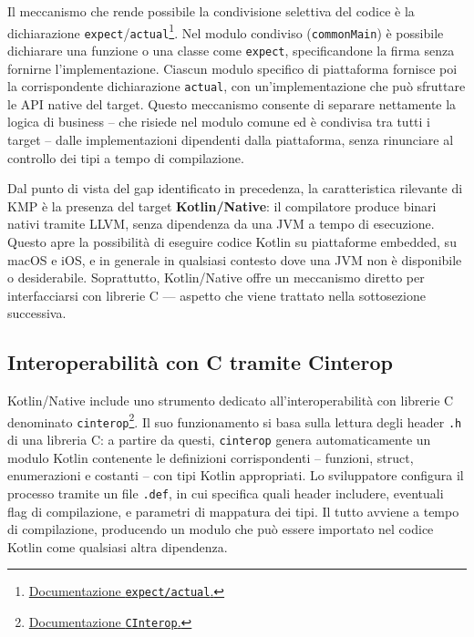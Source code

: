 Il meccanismo che rende possibile la condivisione selettiva del codice è la dichiarazione \texttt{expect}/\texttt{actual}\footnote{\href{https://kotlinlang.org/docs/multiplatform/multiplatform-expect-actual.html}{Documentazione \texttt{expect/actual}.}}. Nel modulo condiviso (\texttt{commonMain}) è possibile dichiarare una funzione o una classe come \texttt{expect}, specificandone la firma senza fornirne l'implementazione. Ciascun modulo specifico di piattaforma fornisce poi la corrispondente dichiarazione \texttt{actual}, con un'implementazione che può sfruttare le API native del target. Questo meccanismo consente di separare nettamente la logica di business -- che risiede nel modulo comune ed è condivisa tra tutti i target -- dalle implementazioni dipendenti dalla piattaforma, senza rinunciare al controllo dei tipi a tempo di compilazione.

Dal punto di vista del gap identificato in precedenza, la caratteristica rilevante di KMP è la presenza del target \textbf{Kotlin/Native}: il compilatore produce binari nativi tramite LLVM, senza dipendenza da una JVM a tempo di esecuzione. Questo apre la possibilità di eseguire codice Kotlin su piattaforme embedded, su macOS e iOS, e in generale in qualsiasi contesto dove una JVM non è disponibile o desiderabile. Soprattutto, Kotlin/Native offre un meccanismo diretto per interfacciarsi con librerie C — aspetto che viene trattato nella sottosezione successiva.

\subsection{Interoperabilità con C tramite Cinterop}
\label{subsec:background-kmp-cinterop}

Kotlin/Native include uno strumento dedicato all'interoperabilità con librerie C denominato \texttt{cinterop}\footnote{\href{https://kotlinlang.org/docs/native-c-interop.html}{Documentazione \texttt{CInterop}.}}. Il suo funzionamento si basa sulla lettura degli header \texttt{.h} di una libreria C: a partire da questi, \texttt{cinterop} genera automaticamente un modulo Kotlin contenente le definizioni corrispondenti -- funzioni, struct, enumerazioni e costanti -- con tipi Kotlin appropriati. Lo sviluppatore configura il processo tramite un file \texttt{.def}, in cui specifica quali header includere, eventuali flag di compilazione, e parametri di mappatura dei tipi. Il tutto avviene a tempo di compilazione, producendo un modulo che può essere importato nel codice Kotlin come qualsiasi altra dipendenza.

